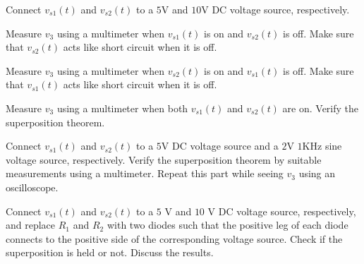 \documentclass[11pt]{article}
\begin{document}
\begin{question}
\begin{subquestion}{Connect $v_{s1}(t)$ and $v_{s2}(t)$ to a $5$V and $10$V DC voltage source, respectively.} 
\answer{}
\end{subquestion}

\begin{subquestion}{Measure $v_3$ using a multimeter when $v_{s1}(t)$ is on and $v_{s2}(t)$ is off. Make sure that $v_{s2}(t)$ acts like short circuit when it is off.} 
\answer{}
\end{subquestion}

\begin{subquestion}{Measure $v_3$ using a multimeter when $v_{s2}(t)$ is on and $v_{s1}(t)$ is off. Make sure that $v_{s1}(t)$ acts like short circuit when it is off.} 
\answer{}
\end{subquestion}

\begin{subquestion}{Measure $v_3$ using a multimeter when both $v_{s1}(t)$ and $v_{s2}(t)$ are on. Verify the superposition theorem.} 
\answer{}
\end{subquestion}

\begin{subquestion}{Connect $v_{s1}(t)$ and $v_{s2}(t)$ to a $5$V DC voltage source and a $2$V $1$KHz sine voltage source, respectively. Verify the superposition theorem by suitable measurements using a multimeter. Repeat this part while seeing $v_3$ using an oscilloscope.} 
\answer{}
\end{subquestion}

\begin{subquestion}{Connect $v_{s1}(t)$ and $v_{s2}(t)$ to a $5$ V and $10$ V DC voltage source, respectively, and replace $R_1$ and $R_2$ with two diodes such that the positive leg of each diode connects to the positive side of the corresponding voltage source. Check if the superposition is held or not. Discuss the results.} 
\answer{}
\end{subquestion}

\end{question}

\end{document}
